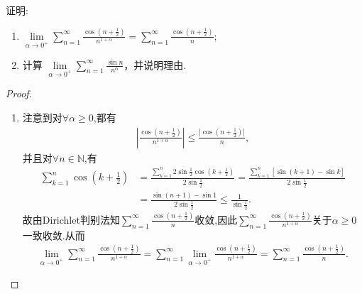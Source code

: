 \documentclass[../../main.tex]{subfiles}%
\begin{document}
\begin{example}
证明: 
\begin{enumerate}[(1)]
\item $\lim\limits_{\alpha \to 0^+} \sum\limits_{n=1}^{\infty} \frac{\cos\left(n + \frac{1}{2}\right)}{n^{1+\alpha}} = \sum\limits_{n=1}^{\infty} \frac{\cos\left(n + \frac{1}{2}\right)}{n}$;

\item 计算 $\lim\limits_{\alpha \to 0^+} \sum\limits_{n=1}^{\infty} \frac{\sin n}{n^{\alpha}}$，并说明理由.
\end{enumerate}
\end{example}
\begin{proof}
\begin{enumerate}[(1)]
\item 注意到对$\forall \alpha \geqslant 0$,都有
\begin{align*}
\left| \frac{\cos \left( n+\frac{1}{2} \right)}{n^{1+\alpha}} \right| \leqslant \frac{|\cos \left( n+\frac{1}{2} \right)|}{n},
\end{align*}
并且对$\forall n\in \mathbb{N}$,有
\begin{align*}
\sum\limits_{k=1}^n \cos \left( k+\frac{1}{2} \right)&=\frac{\sum\limits_{k=1}^n 2\sin \frac{1}{2}\cos \left( k+\frac{1}{2} \right)}{2\sin \frac{1}{2}}=\frac{\sum\limits_{k=1}^n \left[ \sin \left( k+1 \right) -\sin k \right]}{2\sin \frac{1}{2}}\\
&=\frac{\sin \left( n+1 \right) -\sin 1}{2\sin \frac{1}{2}} \leqslant \frac{1}{\sin \frac{1}{2}}.
\end{align*}
故由Dirichlet判别法知$\sum\limits_{n=1}^{\infty} \frac{\cos \left( n+\frac{1}{2} \right)}{n}$收敛,因此$\sum\limits_{n=1}^{\infty} \frac{\cos \left( n+\frac{1}{2} \right)}{n^{1+\alpha}}$关于$\alpha \geqslant 0$一致收敛.从而
\begin{align*}
\lim_{\alpha \rightarrow 0^+} \sum\limits_{n=1}^{\infty} \frac{\cos \left( n+\frac{1}{2} \right)}{n^{1+\alpha}}=\sum\limits_{n=1}^{\infty} \lim_{\alpha \rightarrow 0^+} \frac{\cos \left( n+\frac{1}{2} \right)}{n^{1+\alpha}}=\sum\limits_{n=1}^{\infty} \frac{\cos \left( n+\frac{1}{2} \right)}{n}.
\end{align*}


\end{enumerate}
\end{proof}
\end{document}
